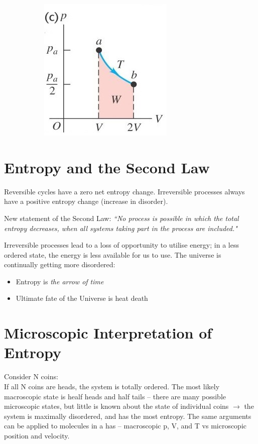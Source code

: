 \documentclass[a4paper, 11pt, normalem]{report}
\begin{document}
\begin{figure}[H]
\begin{subfigure}{0.3\textwidth}
		\includegraphics[width=\textwidth]{Entropy2.jpg}
	\end{subfigure}
\end{figure}

\section{Entropy and the Second Law}
Reversible cycles have a zero net entropy change.
Irreversible processes always have a positive entropy change (increase in disorder).

New statement of the Second Law: \emph{``No process is possible in which the total entropy decreases, when all systems taking part in the process are included."}

Irreversible processes lead to a loss of opportunity to utilise energy; in a less ordered state, the energy is less available for us to use.
The universe is continually getting more disordered:
\begin{itemize}
	\item Entropy is \emph{the arrow of time}
	\item Ultimate fate of the Universe is heat death
\end{itemize}

\section{Microscopic Interpretation of Entropy}
Consider N coins:\\
If all N coins are heads, the system is totally ordered.
The most likely macroscopic state is healf heads and half tails -- there are many possible microscopic states, but little is known about the state of individual coins $\rightarrow$ the system is maximally disordered, and has the most entropy.
The same arguments can be applied to molecules in a has -- macroscopic p, V, and T vs microscopic position and velocity.
\end{document}
